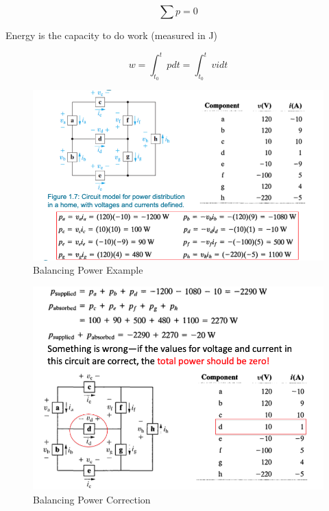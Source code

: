 \documentclass[14pt]{memoir}
\begin{document}
\begin{equation}
\sum p = 0
\end{equation}

Energy is the capacity to do work (measured in J)

\begin{equation}
w = \int_{t_0}^t p dt = \int_{t_0}^t  v i dt
\end{equation}



\begin{figure}[h]
\begin{center}
\includegraphics[scale=0.60]{fig/fig01_07a.png}
\caption{Balancing Power Example}
\label{fig:f01_07a}
\end{center}
\end{figure}


\begin{figure}[h]
\begin{center}
\includegraphics[scale=0.60]{fig/fig01_07b.png}
\caption{Balancing Power Correction}
\label{fig:f01_07b}
\end{center}
\end{figure}
\end{document}
